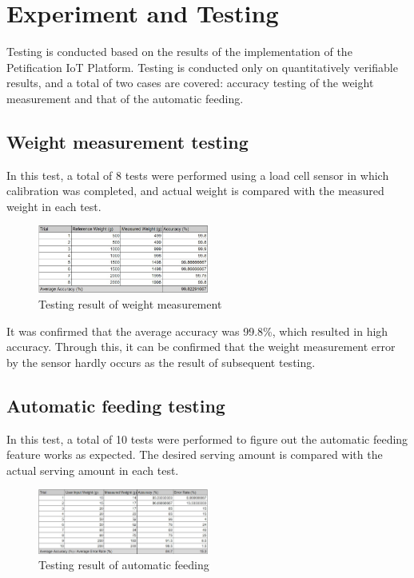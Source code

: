 \documentclass[conference]{IEEEtran}
\begin{document}
\section{Experiment and Testing}
Testing is conducted based on the results of the implementation of the Petification IoT Platform. Testing is conducted only on quantitatively verifiable results, and a total of two cases are covered: accuracy testing of the weight measurement and that of the automatic feeding.

\subsection{Weight measurement testing}
In this test, a total of 8 tests were performed using a load cell sensor in which calibration was completed, and actual weight is compared with the measured weight in each test.

\begin{figure}[htbp]
\centerline{\includegraphics[width=0.5\textwidth]{./images/Calibration_sheet.jpg}}
\caption{Testing result of weight measurement}
\label{fig}
\end{figure}

It was confirmed that the average accuracy was 99.8\%, which resulted in high accuracy. Through this, it can be confirmed that the weight measurement error by the sensor hardly occurs as the result of subsequent testing.

\subsection{Automatic feeding testing}
In this test, a total of 10 tests were performed to figure out the automatic feeding feature works as expected. The desired serving amount is compared with the actual serving amount in each test.

\begin{figure}[htbp]
\centerline{\includegraphics[width=0.5\textwidth]{./images/Feeding_sheet.jpg}}
\caption{Testing result of automatic feeding}
\label{fig}
\end{figure}
\end{document}
